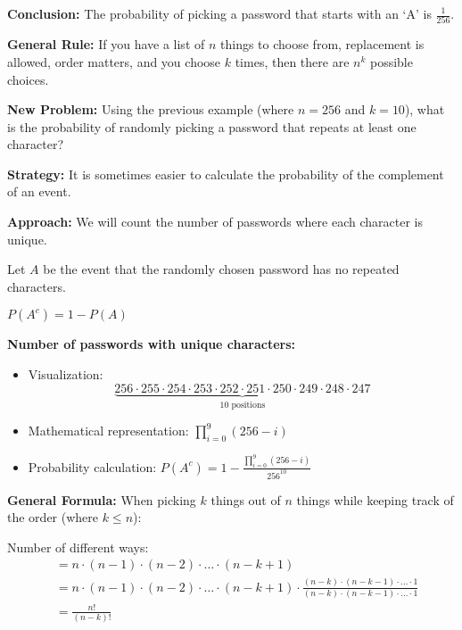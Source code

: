\documentclass{article}
\begin{document}
\textbf{Conclusion:} The probability of picking a password that starts with an `A' is $\frac{1}{256}$.

\noindent
\textbf{General Rule:} If you have a list of $n$ things to choose from, replacement is allowed, order matters, and you choose $k$ times, then there are $n^k$ possible choices.

\vspace{0.5cm}

\noindent
\textbf{New Problem:} Using the previous example (where $n = 256$ and $k = 10$), what is the probability of randomly picking a password that repeats at least one character?

\vspace{0.3cm}

\noindent
\textbf{Strategy:} It is sometimes easier to calculate the probability of the complement of an event.

\vspace{0.3cm}

\noindent
\textbf{Approach:} We will count the number of passwords where each character is unique.

\vspace{0.3cm}

\noindent
Let $A$ be the event that the randomly chosen password has no repeated characters.

$P(A^c) = 1 - P(A)$


\textbf{Number of passwords with unique characters:}
\begin{itemize}
    \item Visualization:
        \[\underbrace{256 \cdot 255 \cdot 254 \cdot 253 \cdot 252 \cdot 251 \cdot 250 \cdot 249 \cdot 248 \cdot 247}_{10\text{ positions}}\]
    \item Mathematical representation: $\prod_{i=0}^{9} (256 - i)$
    \item Probability calculation: $P(A^c) = 1 - \frac{\prod_{i=0}^{9} (256 - i)}{256^{10}}$
\end{itemize}
 
\vspace{0.5cm}

\pagebreak
\noindent
\textbf{General Formula:} When picking $k$ things out of $n$ things while keeping track of the order (where $k \leq n$):

\vspace{0.3cm}

\noindent
Number of different ways:
\begin{align*}
    &= n \cdot (n-1) \cdot (n-2) \cdot \ldots \cdot (n-k+1) \\
    &= n \cdot (n-1) \cdot (n-2) \cdot \ldots \cdot (n-k+1) \cdot \frac{(n-k) \cdot (n-k-1) \cdot \ldots \cdot 1}{(n-k) \cdot (n-k-1) \cdot \ldots \cdot 1} \\
    &= \frac{n!}{(n-k)!}
\end{align*}
\end{document}
